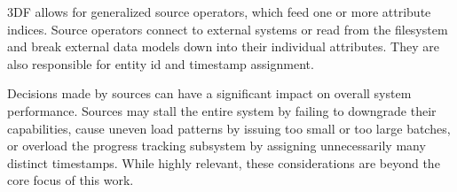 \documentclass[../index.tex]{subfiles}
\begin{document}
3DF allows for generalized source operators, which feed one or more
attribute indices. Source operators connect to external systems or
read from the filesystem and break external data models down into
their individual attributes. They are also responsible for entity id
and timestamp assignment.

Decisions made by sources can have a significant impact on overall
system performance. Sources may stall the entire system by failing to
downgrade their capabilities, cause uneven load patterns by issuing
too small or too large batches, or overload the progress tracking
subsystem by assigning unnecessarily many distinct timestamps. While
highly relevant, these considerations are beyond the core focus of
this work.
\end{document}
